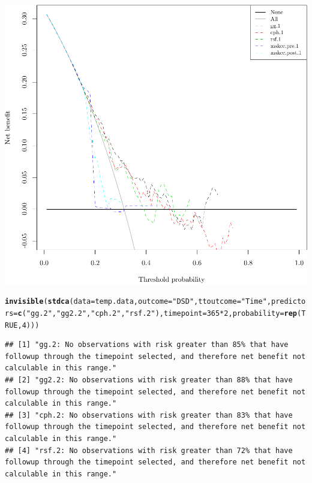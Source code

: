 \documentclass{article}\usepackage[]{graphicx}\usepackage[]{color}
\makeatletter
\def\maxwidth{ %
  \ifdim\Gin@nat@width>\linewidth
    \linewidth
  \else
    \Gin@nat@width
  \fi
}
\newcommand{\hlnum}[1]{\textcolor[rgb]{0.686,0.059,0.569}{#1}}%
\newcommand{\hlstr}[1]{\textcolor[rgb]{0.192,0.494,0.8}{#1}}%
\newcommand{\hlopt}[1]{\textcolor[rgb]{0,0,0}{#1}}%
\newcommand{\hlstd}[1]{\textcolor[rgb]{0.345,0.345,0.345}{#1}}%
\newcommand{\hlkwc}[1]{\textcolor[rgb]{0.333,0.667,0.333}{#1}}%
\newcommand{\hlkwd}[1]{\textcolor[rgb]{0.737,0.353,0.396}{\textbf{#1}}}%
\newenvironment{kframe}{%
 \def\at@end@of@kframe{}%
 \ifinner\ifhmode%
  \def\at@end@of@kframe{\end{minipage}}%
  \begin{minipage}{\columnwidth}%
 \fi\fi%
 \def\FrameCommand##1{\hskip\@totalleftmargin \hskip-\fboxsep
 \colorbox{shadecolor}{##1}\hskip-\fboxsep
     \hskip-\linewidth \hskip-\@totalleftmargin \hskip\columnwidth}%
 \MakeFramed {\advance\hsize-\width
   \@totalleftmargin\z@ \linewidth\hsize
   \@setminipage}}%
 {\par\unskip\endMakeFramed%
 \at@end@of@kframe}
\newenvironment{knitrout}{}{} %
\makeatother
\begin{document}
\begin{knitrout}
{\centering \includegraphics[width=\maxwidth]{figure/05-model-selection-dca-1} 

}


\begin{kframe}\begin{alltt}
\hlkwd{invisible}\hlstd{(}\hlkwd{stdca}\hlstd{(}\hlkwc{data} \hlstd{= temp.data,} \hlkwc{outcome} \hlstd{=} \hlstr{"DSD"}\hlstd{,} \hlkwc{ttoutcome} \hlstd{=} \hlstr{"Time"}\hlstd{,} \hlkwc{predictors} \hlstd{=} \hlkwd{c}\hlstd{(}\hlstr{"gg.2"}\hlstd{,} \hlstr{"gg2.2"}\hlstd{,} \hlstr{"cph.2"}\hlstd{,} \hlstr{"rsf.2"}\hlstd{),} \hlkwc{timepoint} \hlstd{=} \hlnum{365}\hlopt{*}\hlnum{2}\hlstd{,} \hlkwc{probability} \hlstd{=} \hlkwd{rep}\hlstd{(}\hlnum{TRUE}\hlstd{,} \hlnum{4}\hlstd{)))}
\end{alltt}
\begin{verbatim}
## [1] "gg.2: No observations with risk greater than 85% that have followup through the timepoint selected, and therefore net benefit not calculable in this range." 
## [2] "gg2.2: No observations with risk greater than 88% that have followup through the timepoint selected, and therefore net benefit not calculable in this range."
## [3] "cph.2: No observations with risk greater than 83% that have followup through the timepoint selected, and therefore net benefit not calculable in this range."
## [4] "rsf.2: No observations with risk greater than 72% that have followup through the timepoint selected, and therefore net benefit not calculable in this range."
\end{verbatim}
\end{kframe}


\end{knitrout}
\end{document}
